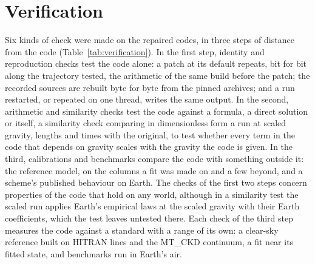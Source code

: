 \section{Verification}

Six kinds of check were made on the repaired codes, in three steps of distance from the code
(Table~\ref{tab:verification}). In the first step, identity and reproduction checks test the code alone: a patch
at its default repeats, bit for bit along the trajectory tested, the arithmetic of the same build before the patch;
the recorded sources are rebuilt byte for byte from the pinned archives; and a run restarted, or repeated on one
thread, writes the same output. In the second, arithmetic and similarity checks test the code against a formula,
a direct solution or itself, a similarity check comparing in dimensionless form a run at scaled gravity, lengths
and times with the original, to test whether every term in the code that depends on gravity scales with the gravity the code is given. In the third, calibrations and
benchmarks compare the code with something outside it: the reference model, on the columns a fit was made on and a
few beyond, and a scheme's published behaviour on Earth. The checks of the first two steps concern properties of
the code that hold on any world, although in a similarity test the scaled run applies Earth's empirical laws at the scaled gravity with their Earth coefficients, which the test leaves untested there. Each check of the third step measures the code against a standard with a range of its
own: a clear-sky reference built on HITRAN lines and the MT\_CKD continuum, a fit near its fitted state, and
benchmarks run in Earth's air.

